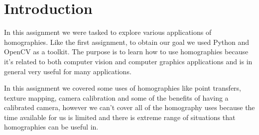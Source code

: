 \section{Introduction}

In this assignment we were tasked to explore various applications of homographies. Like the first assignment, to obtain our goal we used Python and OpenCV as a toolkit. The purpose is to learn how to use homographies because it's related to both computer vision and computer graphics applications and is in general very useful for many applications. 

In this assignment we covered some uses of homographies like point transfers, texture mapping, camera calibration and some of the benefits of having a calibrated camera, however we can't cover all of the homography uses because the time available for us is limited and there is extreme range of situations that homographies can be useful in.
